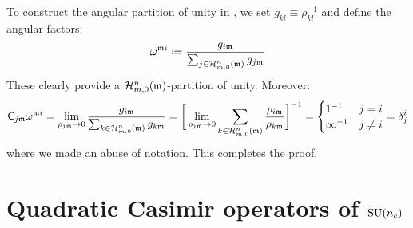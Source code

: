 To construct the angular partition of unity in , we set $ g_{kl} \equiv \rho_{kl}^{-1} $ and define the angular factors:
\begin{equation}
  \omega^{\ur i} \defeq \frac{g_{i\ur}}{\sum_{j \in \prt{n}{m}(\ur)} g_{j\ur}}
\end{equation}
These clearly provide a $ \mathcal{H}^{n}_{m,0}(\mathfrak{m}) $-partition of unity. Moreover:
\begin{equation*}
  \mathsf{C}_{j\mathfrak{m}} \omega^{\mathfrak{m} i} = \lim_{\rho_{j\mathfrak{m}} \rightarrow 0} \frac{g_{i\mathfrak{m}}}{\sum_{k \in \mathcal{H}^{n}_{m,0}(\mathfrak{m})} g_{k\mathfrak{m}}} = \bigg[ \lim_{\rho_{j\mathfrak{m}} \rightarrow 0} \sum_{k \in \mathcal{H}^{n}_{m,0}(\mathfrak{m})} \frac{\rho_{i\mathfrak{m}}}{\rho_{k\mathfrak{m}}} \bigg]^{-1} =
  \begin{cases}
    1^{-1} & j = i \\
    \infty^{-1} & j \neq i
  \end{cases}
  = \delta^i_j
\end{equation*}
where we made an abuse of notation. This completes the proof.

\section{Quadratic Casimir operators of \texorpdfstring{$ \mathrm{SU}(n_c) $}{SU(n)}}
\label{sec:cas-op}

